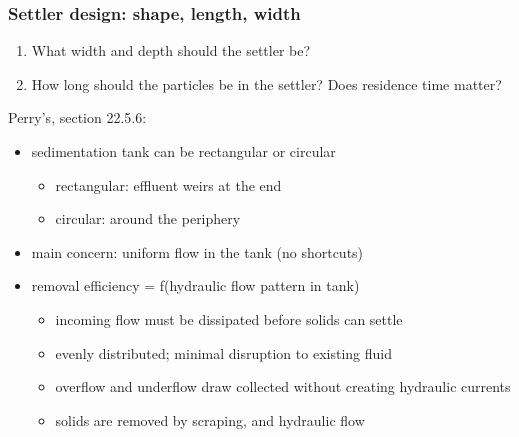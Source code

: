 \begin{frame}\frametitle{Settler design: shape, length, width}
	\begin{enumerate}
		\item	What width and depth should the settler be?
		\item	How long should the particles be in the settler? Does residence time matter?
	\end{enumerate}
	
	Perry's, section 22.5.6:
	\begin{itemize}
		\item	sedimentation tank can be rectangular or circular
		\begin{itemize}
			\item	rectangular: effluent weirs at the end 
			\item	circular: around the periphery 
		\end{itemize}
		\item	main concern: uniform flow in the tank (no shortcuts)		
		\item	removal efficiency = f(hydraulic flow pattern in tank)
		\begin{itemize}
			\item	incoming flow must be dissipated before solids can settle
			\item	evenly distributed; minimal disruption to existing fluid
			\item	overflow and underflow draw collected without creating hydraulic currents
			\item	solids are removed by scraping, and hydraulic flow
		\end{itemize}
	\end{itemize}
\end{frame}


